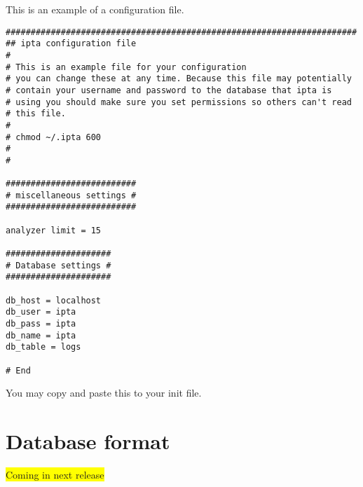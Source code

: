 \documentclass[english,twoside,openright,a4paper,12pt]{article}
\newcommand{\hilight}[1]{\colorbox{yellow}{#1}}
\begin{document}
This is an example of a configuration file.

\begin{verbatim}
######################################################################
## ipta configuration file
#
# This is an example file for your configuration
# you can change these at any time. Because this file may potentially
# contain your username and password to the database that ipta is 
# using you should make sure you set permissions so others can't read
# this file.
#
# chmod ~/.ipta 600
#
#

##########################
# miscellaneous settings #
##########################

analyzer limit = 15

#####################
# Database settings #
#####################

db_host = localhost
db_user = ipta
db_pass = ipta
db_name = ipta
db_table = logs

# End
\end{verbatim}

You may copy and paste this to your init file.

\section{Database format}

\hilight{Coming in next release}
\end{document}
